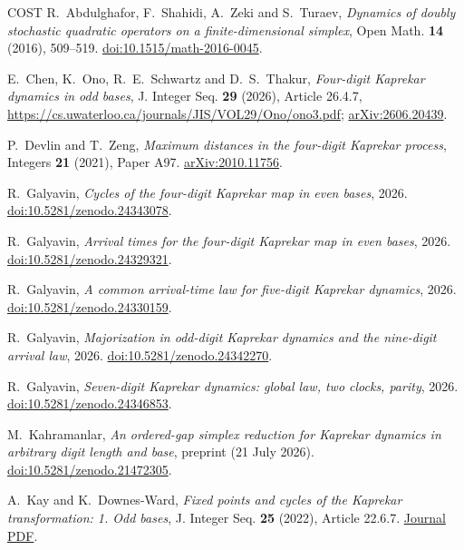 \documentclass[11pt,reqno]{amsart}
\theoremstyle{remark}
\begin{document}
\begingroup\raggedright
\begin{thebibliography}{COST}
R.~Abdulghafor, F.~Shahidi, A.~Zeki and S.~Turaev,
\emph{Dynamics of doubly stochastic quadratic operators on a finite-dimensional simplex},
Open Math. \textbf{14} (2016), 509--519.
\href{https://doi.org/10.1515/math-2016-0045}{doi:10.1515/math-2016-0045}.

E.~Chen, K.~Ono, R.~E.~Schwartz and D.~S.~Thakur,
\emph{Four-digit Kaprekar dynamics in odd bases},
J. Integer Seq. \textbf{29} (2026), Article 26.4.7,
\url{https://cs.uwaterloo.ca/journals/JIS/VOL29/Ono/ono3.pdf};
\href{https://arxiv.org/abs/2606.20439}{arXiv:2606.20439}.

P.~Devlin and T.~Zeng, \emph{Maximum distances in the four-digit Kaprekar process},
Integers \textbf{21} (2021), Paper A97.
\href{https://arxiv.org/abs/2010.11756}{arXiv:2010.11756}.

R.~Galyavin, \emph{Cycles of the four-digit Kaprekar map in even bases}, 2026.
\href{https://doi.org/10.5281/zenodo.24343078}{doi:10.5281/zenodo.24343078}.

R.~Galyavin, \emph{Arrival times for the four-digit Kaprekar map in even bases}, 2026.
\href{https://doi.org/10.5281/zenodo.24329321}{doi:10.5281/zenodo.24329321}.

R.~Galyavin, \emph{A common arrival-time law for five-digit Kaprekar dynamics}, 2026.
\href{https://doi.org/10.5281/zenodo.24330159}{doi:10.5281/zenodo.24330159}.

R.~Galyavin, \emph{Majorization in odd-digit Kaprekar dynamics and the nine-digit arrival law}, 2026.
\href{https://doi.org/10.5281/zenodo.24342270}{doi:10.5281/zenodo.24342270}.

R.~Galyavin, \emph{Seven-digit Kaprekar dynamics: global law, two clocks, parity}, 2026.
\href{https://doi.org/10.5281/zenodo.24346853}{doi:10.5281/zenodo.24346853}.

M.~Kahramanlar, \emph{An ordered-gap simplex reduction for Kaprekar dynamics in arbitrary digit length and base}, preprint (21 July 2026).
\href{https://doi.org/10.5281/zenodo.21472305}{doi:10.5281/zenodo.21472305}.

A.~Kay and K.~Downes-Ward, \emph{Fixed points and cycles of the Kaprekar transformation: 1. Odd bases},
J. Integer Seq. \textbf{25} (2022), Article 22.6.7.
\href{https://cs.uwaterloo.ca/journals/JIS/VOL25/Kay/kay5.pdf}{Journal PDF}.


\end{thebibliography}
\end{document}
